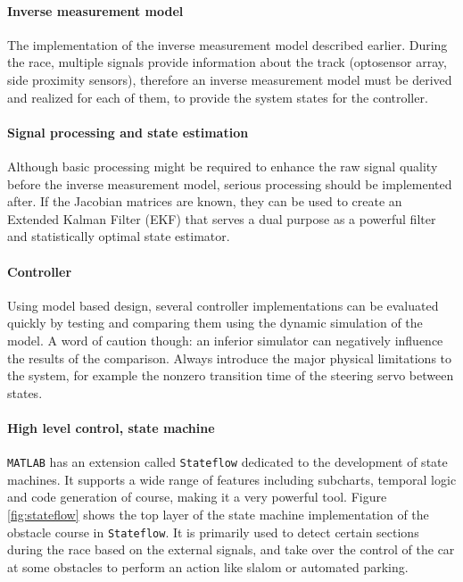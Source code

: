 \paragraph{Inverse measurement model}

The implementation of the inverse measurement model described earlier. During the race, multiple signals provide information about the track (optosensor array, side proximity sensors), therefore an inverse measurement model must be derived and realized for each of them, to provide the system states for the controller.

\paragraph{Signal processing and state estimation}

Although basic processing might be required to enhance the raw signal quality before the inverse measurement model, serious processing should be implemented after. If the Jacobian matrices are known, they can be used to create an Extended Kalman Filter (EKF) that serves a dual purpose as a powerful filter and statistically optimal state estimator.

\paragraph{Controller}

Using model based design, several controller implementations can be evaluated quickly by testing and comparing them using the dynamic simulation of the model. A word of caution though: an inferior simulator can negatively influence the results of the comparison. Always introduce the major physical limitations to the system, for example the nonzero transition time of the steering servo between states.

\paragraph{High level control, state machine}

\verb!MATLAB! has an extension called \verb!Stateflow! dedicated to the development of state machines. It supports a wide range of features including subcharts, temporal logic and code generation of course, making it a very powerful tool. Figure \ref{fig:stateflow} shows the top layer of the state machine implementation of the obstacle course in \verb!Stateflow!. It is primarily used to detect certain sections during the race based on the external signals, and take over the control of the car at some obstacles to perform an action like slalom or automated parking.

